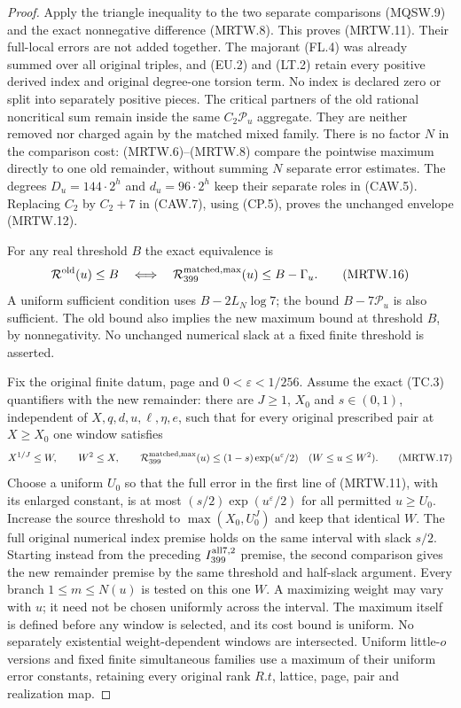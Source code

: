 \begin{proof}
Apply the triangle inequality to the two separate comparisons
(MQSW.9) and the exact nonnegative difference (MRTW.8).
This proves (MRTW.11). Their full-local errors are not added
together. The majorant (FL.4) was already summed over all
original triples, and (EU.2) and (LT.2) retain every positive
derived index and original degree-one torsion term.
No index is declared zero or split into separately positive pieces.
The critical partners of the old rational noncritical sum remain
inside the same $C_2\mathcal P_u$ aggregate. They are neither
removed nor charged again by the matched mixed family.
There is no factor $N$ in the comparison cost: (MRTW.6)--(MRTW.8)
compare the pointwise maximum directly to one old remainder,
without summing $N$ separate error estimates.
The degrees $D_u=144\cdot2^h$ and $d_u=96\cdot2^h$ keep their
separate roles in (CAW.5). Replacing $C_2$ by $C_2+7$ in
(CAW.7), using (CP.5), proves the unchanged envelope (MRTW.12).

For any real threshold $B$ the exact equivalence is
\[
 \mathcal R^{\rm old}(u)\leq B
 \quad\Longleftrightarrow\quad
 \mathcal R_{399}^{\rm matched,max}(u)\leq B-\Gamma_u.
 \tag{MRTW.16}
\]
A uniform sufficient condition uses $B-2L_N\log7$; the bound
$B-7\mathcal P_u$ is also sufficient. The old bound also implies the new maximum
bound at threshold $B$, by nonnegativity. No unchanged numerical
slack at a fixed finite threshold is asserted.

Fix the original finite datum, page and $0<\varepsilon<1/256$.
Assume the exact (TC.3) quantifiers with the new remainder:
there are $J\geq1$, $X_0$ and $s\in(0,1)$, independent of
$X,q,d,u,\ell,\eta,e$, such that for every original prescribed
pair at $X\geq X_0$ one window satisfies
\[
 X^{1/J}\leq W,\qquad W^2\leq X,\qquad
 \mathcal R_{399}^{\rm matched,max}(u)
             \leq(1-s)\exp(u^\varepsilon/2)
                       \quad(W\leq u\leq W^2).
 \tag{MRTW.17}
\]
Choose a uniform $U_0$ so that the full error in the first line
of (MRTW.11), with its enlarged constant, is at most
$(s/2)\exp(u^\varepsilon/2)$ for all permitted $u\geq U_0$.
Increase the source threshold to $\max(X_0,U_0^J)$ and keep
that identical $W$. The full original numerical index premise
holds on the same interval with slack $s/2$.
Starting instead from the preceding $I_{399}^{\rm all7,2}$
premise, the second comparison gives the new remainder premise
by the same threshold and half-slack argument.
Every branch $1\leq m\leq N(u)$ is tested on this one $W$.
A maximizing weight may vary with $u$; it need not be chosen
uniformly across the interval. The maximum itself is defined
before any window is selected, and its cost bound is uniform.
No separately existential weight-dependent windows are intersected.
Uniform little-$o$ versions and fixed finite simultaneous families
use a maximum of their uniform error constants, retaining every
original rank $R.t$, lattice, page, pair and realization map.
\end{proof}

